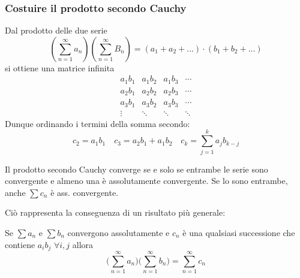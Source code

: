 \documentclass[10pt, oneside]{book}
\theoremstyle{plain}
\begin{document}
\subsubsection{Costuire il prodotto secondo Cauchy} Dal prodotto delle due serie
\[(\sum \limits_{n=1}^{\infty}a_n)(\sum \limits_{n=1}^{\infty}B_n) = (a_1 + a_2 + ...) \cdot (b_1 + b_2 + ...)\]
si ottiene una matrice infinita
\[\begin{matrix}
    a_1 b_1 & a_1 b_2 & a_1 b_3 &\cdots \\
    a_2 b_1 & a_2 b_2 & a_2 b_3 & \cdots \\
    a_3 b_1 & a_3 b_2 & a_3 b_3 & \cdots \\
    \vdots & \ddots & \ddots & \ddots 
\end{matrix}\]
Dunque ordinando i termini della somma secondo:
\[c_2 = a_1 b_1 \quad c_3 = a_2 b_1 + a_1 b_2 \quad c_k = \sum\limits_{j=1}^{k} a_j b_{k - j}\]
\begin{ther}
    Il prodotto secondo Cauchy converge se e solo se entrambe le serie sono convergente e almeno una è assolutamente convergente. Se lo sono entrambe, anche $\sum c_n$ è ass. convergente.
\end{ther}
Ciò rappresenta la conseguenza di un risultato più generale:
\begin{ther}
    Se $\sum a_n$ e $\sum b_n$ convergono assolutamente e $c_n$ è una qualsiasi successione che contiene $a_i b_j$ $\forall i, j$ allora
    \[\bigg(\sum \limits_{n=1}^\infty a_n \bigg)\bigg(\sum \limits_{n=1}^\infty b_n\bigg) = \sum \limits_{n=1}^\infty c_n\]
\end{ther}
\end{document}
